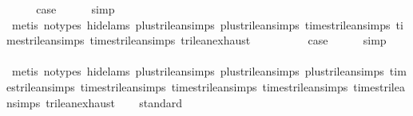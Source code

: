 \begin{isabellebody}
\ \ \isamarkupfalse%
\ \isamarkupfalse%
\ {\isacharquery}case\isanewline
\ \ \ \ \isamarkupfalse%
\ simp\isanewline
\ \ \ \ \isamarkupfalse%
\ {\isacharparenleft}metis\ {\isacharparenleft}no{\isacharunderscore}types{\isacharcomma}\ hide{\isacharunderscore}lams{\isacharparenright}\ plus{\isacharunderscore}trilean{\isachardot}simps{\isacharparenleft}{}{\isacharparenright}\ plus{\isacharunderscore}trilean{\isachardot}simps{\isacharparenleft}{}{\isacharparenright}\ times{\isacharunderscore}trilean{\isachardot}simps{\isacharparenleft}{}{\isacharparenright}\ times{\isacharunderscore}trilean{\isachardot}simps{\isacharparenleft}{}{\isacharparenright}\ times{\isacharunderscore}trilean{\isachardot}simps{\isacharparenleft}{}{\isacharparenright}\ trilean{\isachardot}exhaust{\isacharparenright}\isanewline
{}\isamarkupfalse%
\isanewline
\ \ \isamarkupfalse%
\ {}\isanewline
\ \ \isamarkupfalse%
\ \isamarkupfalse%
\ {\isacharquery}case\isanewline
\ \ \ \ \isamarkupfalse%
\ simp\isanewline
\ \ \ \ \isamarkupfalse%
\ {\isacharparenleft}metis\ {\isacharparenleft}no{\isacharunderscore}types{\isacharcomma}\ hide{\isacharunderscore}lams{\isacharparenright}\ plus{\isacharunderscore}trilean{\isachardot}simps{\isacharparenleft}{}{\isacharparenright}\ plus{\isacharunderscore}trilean{\isachardot}simps{\isacharparenleft}{}{\isacharparenright}\ plus{\isacharunderscore}trilean{\isachardot}simps{\isacharparenleft}{}{\isacharparenright}\ times{\isacharunderscore}trilean{\isachardot}simps{\isacharparenleft}{}{\isacharparenright}\ times{\isacharunderscore}trilean{\isachardot}simps{\isacharparenleft}{}{\isacharparenright}\ times{\isacharunderscore}trilean{\isachardot}simps{\isacharparenleft}{}{\isacharparenright}\ times{\isacharunderscore}trilean{\isachardot}simps{\isacharparenleft}{}{\isacharparenright}\ times{\isacharunderscore}trilean{\isachardot}simps{\isacharparenleft}{}{\isacharparenright}\ trilean{\isachardot}exhaust{\isacharparenright}\isanewline
{}\isamarkupfalse%
%
\endisatagproof
{\isafoldproof}%
%
\isadelimproof
\isanewline
%
\endisadelimproof
\isanewline
{}\isamarkupfalse%
\isanewline
%
\isadelimproof
\ \ %
\endisadelimproof
%
\isatagproof
{}\isamarkupfalse%
\ standard\isanewline
\ \ \ \ \ \ \isamarkupfalse%

\end{isabellebody}
